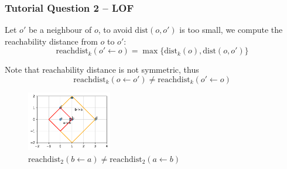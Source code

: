 \documentclass[aspectratio=169, 10pt]{beamer}
\begin{document}
\begin{frame}
    \frametitle{Tutorial Question 2 -- LOF}

    Let $o'$ be a neighbour of $o$, to avoid $\text{dist}(o, o')$ is too small, we compute the reachability distance from $o$ to $o'$:
    \[
        \text{reachdist}_k(o' \leftarrow o) = \max\{\text{dist}_k(o), \text{dist}(o, o')\}
    \]
    
    Note that reachability distance is not symmetric, thus 
    \[
        \text{reachdist}_k(o \leftarrow o') \neq \text{reachdist}_k(o' \leftarrow o)
    \]

    \begin{figure}
        \centering
        \includegraphics[width=0.33\textwidth]{../imgs/reachdist_ab.pdf}
        \caption{$\text{reachdist}_2(b \leftarrow a) \neq \text{reachdist}_2(a \leftarrow b)$}
    \end{figure}

\end{frame}
\end{document}
